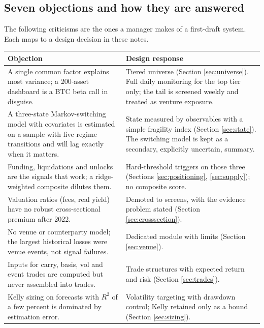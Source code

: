 \documentclass[11pt,a4paper]{article}
\theoremstyle{definition}
\begin{document}
\subsection{Seven objections and how they are answered}

The following criticisms are the ones a manager makes of a first-draft system. Each maps to a design decision in these notes.

\begin{center}
\small
\begin{tabular}{p{} p{}}
\toprule
Objection & Design response \\
\midrule
A single common factor explains most variance; a 200-asset dashboard is a BTC beta call in disguise. & Tiered universe (Section \ref{sec:universe}). Full daily monitoring for the top tier only; the tail is screened weekly and treated as venture exposure. \\
A three-state Markov-switching model with covariates is estimated on a sample with five regime transitions and will lag exactly when it matters. & State measured by observables with a simple fragility index (Section \ref{sec:state}). The switching model is kept as a secondary, explicitly uncertain, summary. \\
Funding, liquidations and unlocks are the signals that work; a ridge-weighted composite dilutes them. & Hard-threshold triggers on those three (Sections \ref{sec:positioning}, \ref{sec:supply}); no composite score. \\
Valuation ratios (fees, real yield) have no robust cross-sectional premium after 2022. & Demoted to screens, with the evidence problem stated (Section \ref{sec:crosssection}). \\
No venue or counterparty model; the largest historical losses were venue events, not signal failures. & Dedicated module with limits (Section \ref{sec:venue}). \\
Inputs for carry, basis, vol and event trades are computed but never assembled into trades. & Trade structures with expected return and risk (Section \ref{sec:trades}). \\
Kelly sizing on forecasts with $R^2$ of a few percent is dominated by estimation error. & Volatility targeting with drawdown control; Kelly retained only as a bound (Section \ref{sec:sizing}). \\
\bottomrule
\end{tabular}
\end{center}
\end{document}
